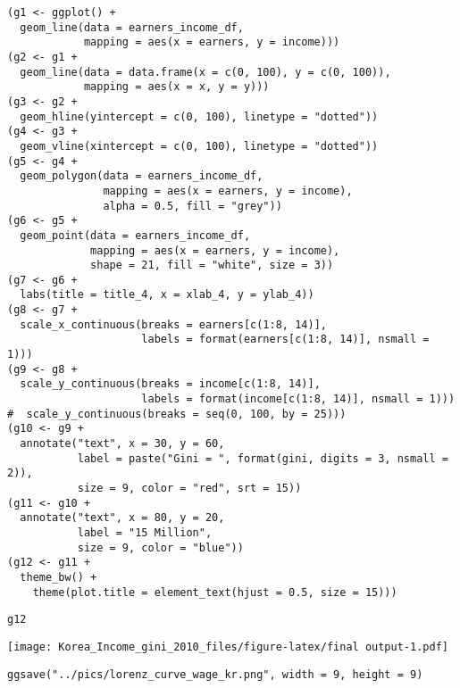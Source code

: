 \documentclass[
]{article}
\begin{document}
\begin{verbatim}
(g1 <- ggplot() +
  geom_line(data = earners_income_df, 
            mapping = aes(x = earners, y = income))) 
(g2 <- g1 +
  geom_line(data = data.frame(x = c(0, 100), y = c(0, 100)), 
            mapping = aes(x = x, y = y))) 
(g3 <- g2 +
  geom_hline(yintercept = c(0, 100), linetype = "dotted")) 
(g4 <- g3 +
  geom_vline(xintercept = c(0, 100), linetype = "dotted")) 
(g5 <- g4 + 
  geom_polygon(data = earners_income_df, 
               mapping = aes(x = earners, y = income), 
               alpha = 0.5, fill = "grey")) 
(g6 <- g5 +
  geom_point(data = earners_income_df, 
             mapping = aes(x = earners, y = income), 
             shape = 21, fill = "white", size = 3)) 
(g7 <- g6 +
  labs(title = title_4, x = xlab_4, y = ylab_4))
(g8 <- g7 +
  scale_x_continuous(breaks = earners[c(1:8, 14)], 
                     labels = format(earners[c(1:8, 14)], nsmall = 1))) 
(g9 <- g8 +
  scale_y_continuous(breaks = income[c(1:8, 14)], 
                     labels = format(income[c(1:8, 14)], nsmall = 1)))
#  scale_y_continuous(breaks = seq(0, 100, by = 25))) 
(g10 <- g9 +
  annotate("text", x = 30, y = 60, 
           label = paste("Gini = ", format(gini, digits = 3, nsmall = 2)), 
           size = 9, color = "red", srt = 15)) 
(g11 <- g10 +
  annotate("text", x = 80, y = 20, 
           label = "15 Million", 
           size = 9, color = "blue"))
(g12 <- g11 +
  theme_bw() +
    theme(plot.title = element_text(hjust = 0.5, size = 15)))
\end{verbatim}

\begin{verbatim}
g12
\end{verbatim}

\texttt{[image: Korea\_Income\_gini\_2010\_files/figure-latex/final output-1.pdf]}

\begin{verbatim}
ggsave("../pics/lorenz_curve_wage_kr.png", width = 9, height = 9)
\end{verbatim}
\end{document}

